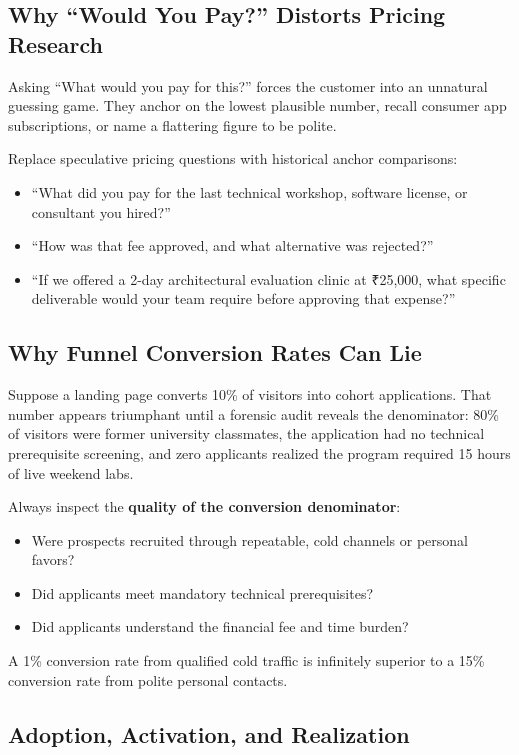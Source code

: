 \subsection{Why ``Would You Pay?'' Distorts Pricing Research}

Asking ``What would you pay for this?'' forces the customer into an unnatural guessing game. They anchor on the lowest plausible number, recall consumer app subscriptions, or name a flattering figure to be polite.

Replace speculative pricing questions with historical anchor comparisons:
\begin{itemize}[leftmargin=1.2em,itemsep=0.2ex]
  \item ``What did you pay for the last technical workshop, software license, or consultant you hired?''
  \item ``How was that fee approved, and what alternative was rejected?''
  \item ``If we offered a 2-day architectural evaluation clinic at ₹25,000, what specific deliverable would your team require before approving that expense?''
\end{itemize}

\subsection{Why Funnel Conversion Rates Can Lie}

Suppose a landing page converts 10\% of visitors into cohort applications. That number appears triumphant until a forensic audit reveals the denominator: 80\% of visitors were former university classmates, the application had no technical prerequisite screening, and zero applicants realized the program required 15 hours of live weekend labs.

Always inspect the \textbf{quality of the conversion denominator}:
\begin{itemize}[leftmargin=1.2em,itemsep=0.2ex]
  \item Were prospects recruited through repeatable, cold channels or personal favors?
  \item Did applicants meet mandatory technical prerequisites?
  \item Did applicants understand the financial fee and time burden?
\end{itemize}
A 1\% conversion rate from qualified cold traffic is infinitely superior to a 15\% conversion rate from polite personal contacts.

\subsection{Adoption, Activation, and Realization}

